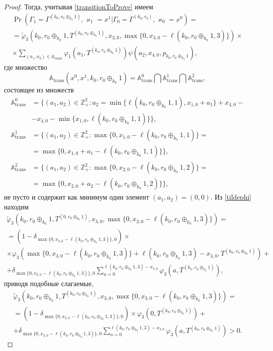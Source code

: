 \documentclass[a4paper,12pt,russian]{extarticle}
\begin{document}
\begin{proof}
Тогда, учитывая \eqref{transitionToProve} имеем
\begin{multline*}
\Pr (\Gamma_{1}=\Gamma^{(k_0,r_0\oplus_{k_0}1)},\varkappa_{1}=x^1 | \Gamma_{0}=\Gamma^{(k_0,r_0)},\varkappa_0=x^0)=\\
=\widetilde{\varphi}_3(k_0,r_0\oplus_{k_0}1,T^{(k_0,r_0\oplus_{k_0}1)},x_{3,0},\max{\{0,x_{3,0} - \ell(k_0,r_0\oplus_{k_0}1,3)\}})\times \\
\times
\sum_{(a_1,a_2)\in {\mathbb A}_{\mathrm{trans}}}\varphi_1(a_1,T^{(k_0,r_0\oplus_{k_0}1)})  \psi(a_2,x_{4,0}, p_{k_0,r_0\oplus_{k_0}1}),
\end{multline*}
где множество 
\begin{equation*}
{\mathbb A}_{\mathrm{trans}}(x^0,x^1,k_0,r_0\oplus_{k_0}1) = {\mathbb A}_{\mathrm{trans}}^0 \bigcap {\mathbb A}_{\mathrm{trans}}^1\bigcap {\mathbb A}_{\mathrm{trans}}^2,
\end{equation*}
состоящее из множеств 
\begin{align*}
{\mathbb A}_{\mathrm{trans}}^0 &= \{(a_1,a_2) \in \mathbb{Z}_+^2 \colon a_2 = \min{\{\ell(k_0,r_0\oplus_{k_0}1,1), x_{1,0}+a_1}\} +x_{4,0}- \\ 
&-x_{4,0} - \min{\{x_{1,0}, \ell(k_0,r_0\oplus_{k_0}1,1)\}}\},\\
{\mathbb A}_{\mathrm{trans}}^1 &= \{(a_1,a_2) \in \mathbb{Z}_+^2 \colon \max{\{0,x_{1,0} - \ell(k_0,r_0\oplus_{k_0}1,1)\}}=\\
&=\max{\{0,x_{1,0}+a_1-\ell(k_0,r_0\oplus_{k_0}1,1)\}}\},\\
 {\mathbb A}_{\mathrm{trans}}^2 &= \{(a_1,a_2) \in \mathbb{Z}_+^2 \colon  \max{\{0,x_{2,0} - \ell(k_0,r_0\oplus_{k_0}1,2)\}}=\\
 &=\max{\{0,x_{2,0}+a_2-\ell(k_0,r_0\oplus_{k_0}1,2)\}}\},
\end{align*}
не пусто и содержит как минимум один элемент $(a_1,a_2)=(0,0)$. Из \eqref{tildephi} находим
\begin{multline*}
\widetilde{\varphi}_3(k_0,r_0\oplus_{k_0}1,T^{(0,r_0\oplus_{k_0}1)},x_{3,0},\max{\{0,x_{3,0} - \ell(k_0,r_0\oplus_{k_0}1,3)\}})= \\=(1-\delta_{\max{\{0,x_{3,0} - \ell(k_0,r_0\oplus_{k_0}1,3)\}},0}) \times \\\times\varphi_3(\max{\{0,x_{3,0} - \ell(k_0,r_0\oplus_{k_0}1,3)\}} + \ell (k_0,r_0\oplus_{k_0}1,3) - x_{3,0},T^{(k_0,r_0\oplus_{k_0}1)} ) +\\
+\delta_{\max{\{0,x_{3,0} - \ell(k_0,r_0\oplus_{k_0}1,3)\}},0} \sum_{a=0}^{\ell(k_0,r_0\oplus_{k_0}1,3)-x_{3,0}}\varphi_3 (a,T^{(k_0,r_0\oplus_{k_0}1)}),
\end{multline*}
приводя подобные слагаемые,
\begin{multline*}
\widetilde{\varphi}_3(k_0,r_0\oplus_{k_0}1,T^{(k_0,r_0\oplus_{k_0}1)},x_{3,0},\max{\{0,x_{3,0} - \ell(k_0,r_0\oplus_{k_0}1,3)\}})=\\=(1-\delta_{\max{\{0,x_{3,0} - \ell(k_0,r_0\oplus_{k_0}1,3)\}},0}) \times \varphi_3(0,T^{(k_0,r_0\oplus_{k_0}1)} ) +\\
+\delta_{\max{\{0,x_{3,0} - \ell(k_0,r_0\oplus_{k_0}1,3)\}},0} \sum_{a=0}^{\ell(k_0,r_0\oplus_{k_0}1,3)-x_{3,0}}\varphi_3 (a,T^{(k_0,r_0\oplus_{k_0}1)})>0.
\end{multline*}


\end{proof}
\end{document}
